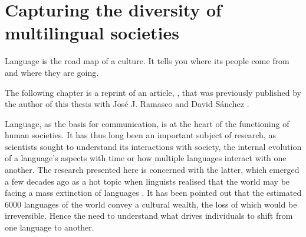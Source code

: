 \documentclass[../thesis.tex]{subfiles}
\begin{document}
\chapter{Capturing the diversity of multilingual societies}
\label{ch:multiling}

\epigraph{
    Language is the road map of a culture. It tells you where its people come from and
    where they are going.
}{
}

The following chapter is a reprint of an article,
, that was previously published by the author of
this thesis with Jos\'{e} J. Ramasco and David S\'{a}nchez
\cite{LoufCapturingDiversity2021}.




Language, as the basis for communication, is at the heart of the functioning of human
societies. It has thus long been an important subject of research, as scientists sought
to understand its interactions with society, the internal evolution of a language's
aspects with time or how multiple languages interact with one another. The research
presented here is concerned with the latter, which emerged a few decades ago as a hot
topic when linguists realised that the world may be facing a mass extinction of
languages
\cite{KraussWorldLanguages1992,GrenobleEndangeredLanguages1998,CrystalLanguageDeath2000}.
It has been pointed out that the estimated \SI{6000}{} languages of the world convey a
cultural wealth, the loss of which would be irreversible. Hence the need to understand
what drives individuals to shift from one language to another.
\end{document}
